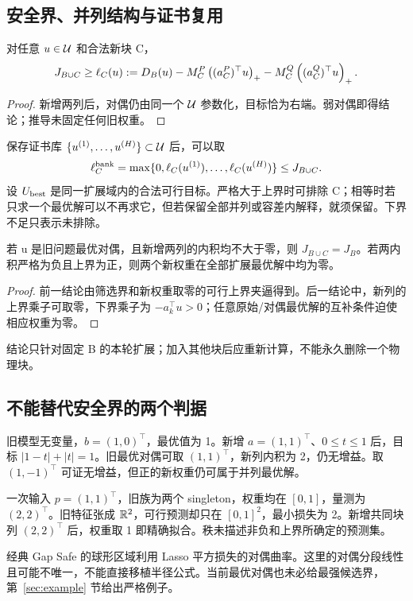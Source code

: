\subsection{安全界、并列结构与证书复用}
\begin{theorem}[允许旧权重共同重估的筛选界]
对任意 $u\in\mathcal U$ 和合法新块 C，
\begin{equation}
 J_{B\cup C}\ge\ell_C(u):=D_B(u)
 -M_C^P\left((a_C^P)^\top u\right)_{+}
 -M_C^Q\left((a_C^Q)^\top u\right)_{+}.
 \label{eq:screen}
\end{equation}
\end{theorem}
\begin{proof}
新增两列后，对偶仍由同一个 $\mathcal U$ 参数化，目标恰为右端。弱对偶即得结论；推导未固定任何旧权重。
\end{proof}
保存证书库 $\{u^{(1)},\ldots,u^{(H)}\}\subset\mathcal U$ 后，可以取
\begin{equation}
 \ell_C^{\rm bank}=\max\{0,\ell_C(u^{(1)}),\ldots,\ell_C(u^{(H)})\}
 \le J_{B\cup C}.
 \label{eq:bank}
\end{equation}
设 $U_{\rm best}$ 是同一扩展域内的合法可行目标。严格大于上界时可排除 C；相等时若只求一个最优解可以不再求它，但若保留全部并列或容差内解释，就须保留。下界不足只表示未排除。

\begin{corollary}[无增益与零权重不同]
若 u 是旧问题最优对偶，且新增两列的内积均不大于零，则 $J_{B\cup C}=J_B$。若两内积严格为负且上界为正，则两个新权重在全部扩展最优解中均为零。
\end{corollary}
\begin{proof}
前一结论由筛选界和新权重取零的可行上界夹逼得到。后一结论中，新列的上界乘子可取零，下界乘子为 $-a_k^\top u>0$；任意原始/对偶最优解的互补条件迫使相应权重为零。
\end{proof}
结论只针对固定 B 的本轮扩展；加入其他块后应重新计算，不能永久删除一个物理块。

\subsection{不能替代安全界的两个判据}
\begin{example}[正内积仍可无增益]
旧模型无变量，$b=(1,0)^\top$，最优值为 1。新增 $a=(1,1)^\top$、$0\le t\le1$ 后，目标 $|1-t|+|t|=1$。旧最优对偶可取 $(1,1)^\top$，新列内积为 2，仍无增益。取 $(1,-1)^\top$ 可证无增益，但正的新权重仍可属于并列最优解。
\end{example}
\begin{example}[秩不增加仍可改善]
一次输入 $p=(1,1)^\top$，旧族为两个 singleton，权重均在 $[0,1]$，量测为 $(2,2)^\top$。旧特征张成 $\mathbb R^2$，可行预测却只在 $[0,1]^2$，最小损失为 2。新增共同块列 $(2,2)^\top$ 后，权重取 1 即精确拟合。秩未描述非负和上界所确定的预测集。
\end{example}
经典 Gap Safe 的球形区域利用 Lasso 平方损失的对偶曲率\citep[\S1--3]{fercoq2015}。这里的对偶分段线性且可能不唯一，不能直接移植半径公式。当前最优对偶也未必给最强候选界，第~\ref{sec:example} 节给出严格例子。

